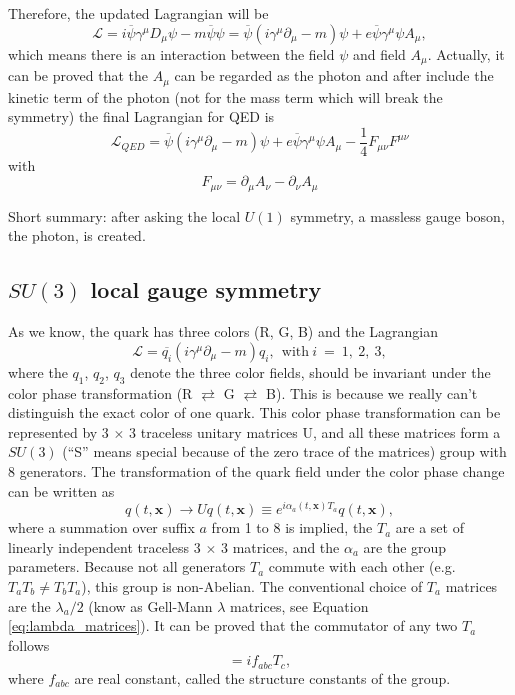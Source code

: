 Therefore, the updated Lagrangian will be
\begin{equation}
\mathcal{L}=i\overline{\psi}\gamma^{\mu}D_\mu \psi-m\overline{\psi}\psi=\overline{\psi}(i\gamma^{\mu}\partial_\mu-m)\psi+e\overline{\psi}\gamma^{\mu}\psi A_\mu,
\label{eq:Lagrangian_Dirac_new}
\end{equation}
which means there is an interaction between the field $\psi$ and field $A_\mu$. Actually, it can be proved that the $A_\mu$ can be regarded as the photon and after include the kinetic term of the photon (not for the mass term which will break the symmetry) the final Lagrangian for QED is
\begin{equation}
\mathcal{L}_{QED}=\overline{\psi}(i\gamma^{\mu}\partial_\mu-m)\psi+e\overline{\psi}\gamma^{\mu}\psi A_\mu-\frac{1}{4}F_{\mu\nu}F^{\mu\nu}
\label{eq:Lagrangian_QED}
\end{equation}
with
\begin{equation}
F_{\mu\nu}=\partial_\mu A_\nu-\partial_\nu A_\mu
\label{eq:F_tensor}
\end{equation}

Short summary: after asking the local $U(1)$ symmetry, a massless gauge boson, the photon, is created.

\subsection{$SU(3)$ local gauge symmetry}\label{subsec:U3_local}

As we know, the quark has three colors (R, G, B) and the Lagrangian
\begin{equation}
\mathcal{L}=\overline{q_i}(i\gamma^{\mu}\partial_\mu-m)q_i,~~\mathrm{with}~i~=~1,~2,~3,
\label{eq:L_quarks}
\end{equation}
where the $q_1$, $q_2$, $q_3$ denote the three color fields, should be invariant under the color phase transformation (R $\rightleftarrows$ G $\rightleftarrows$ B). This is because we really can't distinguish the exact color of one quark. This color phase transformation can be represented by 3 $\times$ 3 traceless unitary matrices U, and all these matrices form a $SU(3)$ (``S'' means special because of the zero trace of the matrices) group with 8 generators. The transformation of the quark field under the color phase change can be written as
\begin{equation}
q(t,\mathbf{x})\rightarrow Uq(t,\mathbf{x})\equiv e^{i\alpha_a(t,\mathbf{x})T_a}q(t,\mathbf{x}),
\label{eq:Quark_transfer}
\end{equation}
where a summation over suffix $a$ from 1 to 8 is implied, the $T_a$ are a set of linearly independent traceless 3 $\times$ 3 matrices, and the $\alpha_a$ are the group parameters. Because not all generators $T_a$ commute with each other (e.g. $T_aT_b\neq T_bT_a$), this group is non-Abelian. The conventional choice of $T_a$ matrices are the $\lambda_a /2$ (know as Gell-Mann $\lambda$ matrices, see Equation \ref{eq:lambda_matrices}). It can be proved that the commutator of any two $T_a$ follows
\begin{equation}
[T_a, T_b]=if_{abc} T_c,
\label{eq:Commutator_T}
\end{equation}
where $f_{abc}$ are real constant, called the structure constants of the group.

